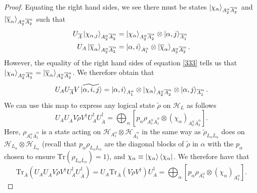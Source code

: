 \documentclass[12pt,a4paper]{report}
\numberwithin{equation}{section}
\newcommand{\ketbra}[2]{\ket{#1}\bra{#2}}
\newcommand{\ketbras}[1]{\ketbra{#1}{#1}}
\newcommand{\ol}[1]{\overline{#1}}
\newcommand{\tr}{\text{Tr}}
\theoremstyle{definition}
\theoremstyle{theorem}
\theoremstyle{theorem}
\theoremstyle{example}
\theoremstyle{definition}
\begin{document}
\begin{proof}
	Equating the right hand sides, we see there must be states $\ket{\chi_{\alpha}}_{A_{2}^{\alpha}\ol{A}_{2}^{\alpha}}$ and $\ket{\ol{\chi}_{\alpha}}_{A_{2}^{\alpha}\ol{A}_{2}^{\alpha}}$ such that
	\begin{equation}
		\begin{aligned}
			U_{\ol{A}}\ket{\chi_{\alpha,j}}_{A_{2}^{\alpha}\ol{A}_{2}^{\alpha}}&=\ket{\chi_{\alpha}}_{A_{2}^{\alpha}\ol{A}_{2}^{\alpha}}\otimes\ket{\alpha,j}_{\ol{A}_{1}^{\alpha}}\\
			U_{A}\ket{\ol{\chi}_{\alpha}}_{A_{2}^{\alpha}\ol{A}_{2}^{\alpha}}&=\ket{\alpha,i}_{A_{1}^{\alpha}}\otimes\ket{\ol{\chi}_{\alpha}}_{A_{2}^{\alpha}\ol{A}_{2}^{\alpha}}.
		\end{aligned}
	\end{equation}
	However, the equality of the right hand sides of equation \ref{333} tells us that $\ket{\chi_{\alpha}}_{A_{2}^{\alpha}\ol{A}_{2}^{\alpha}}=\ket{\ol{\chi}_{\alpha}}_{A_{2}^{\alpha}\ol{A}_{2}^{\alpha}}$. We therefore obtain that
	\begin{equation}\label{imp}
		U_{A}U_{\ol{A}}V\ket{\widetilde{\alpha,i,j}}=\ket{\alpha,i}_{A_{1}^{\alpha}}\otimes\ket{\chi_{\alpha}}_{A_{2}^{\alpha}\ol{A}_{2}^{\alpha}}\otimes\ket{\alpha,j}_{\ol{A}_{1}^{\alpha}}.
	\end{equation}
	We can use this map to express any logical state $\tilde{\rho}$ on $\mathcal{H}_{L}$ as follows
	\begin{equation}
		U_{A}U_{\ol{A}}V\tilde{\rho}V^{\dagger}U_{A}^{\dagger}U_{\ol{A}}^{\dagger}=\bigoplus_{\alpha}\left[p_{\alpha}\rho_{A_{1}^{\alpha}\ol{A}_{1}^{\alpha}}\otimes\left(\chi_{\alpha}\right)_{A_{2}^{\alpha}\ol{A}_{2}^{\alpha}}\right].
	\end{equation}
	Here, $\rho_{A_{1}^{\alpha}\ol{A}_{1}^{\alpha}}$ is a state acting on $\mathcal{H}_{A_{1}^{\alpha}}\otimes\mathcal{H}_{\ol{A}_{1}^{\alpha}}$ in the same way as $\tilde{\rho}_{L_{\alpha}\ol{L}_{\alpha}}$ does on $\mathcal{H}_{L_{\alpha}}\otimes\mathcal{H}_{\ol{L}_{\alpha}}$ (recall that $p_{\alpha}\rho_{L_{\alpha}\ol{L}_{\alpha}}$ are the diagonal blocks of $\tilde{\rho}$ in $\alpha$ with the $p_{\alpha}$ chosen to ensure $\tr(\rho_{L_{\alpha}\ol{L}_{\alpha}})=1$), and $\chi_{\alpha}\equiv\ketbras{\chi_{\alpha}}$. We therefore have that
	\begin{equation}\label{asdfgh}
		\tr_{\ol{A}}\left(U_{A}U_{\ol{A}}V\tilde{\rho}V^{\dagger}U_{A}^{\dagger}U_{\ol{A}}^{\dagger}\right)=U_{A}\tr_{\ol{A}}\left(V\tilde{\rho}V^{\dagger}\right)U_{A}^{\dagger}=\bigoplus_{\alpha}\left[p_{\alpha}\rho_{A_{1}^{\alpha}}\otimes\left(\chi_{\alpha}\right)_{A_{2}^{\alpha}}\right].

\end{equation}
\end{proof}
\end{document}
